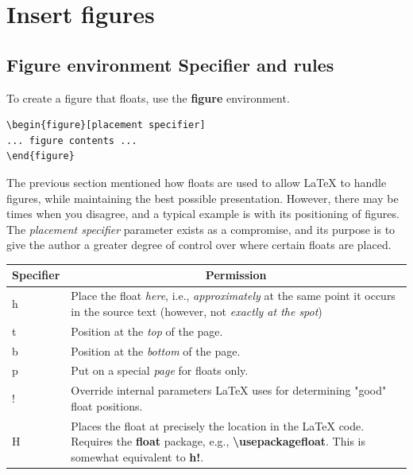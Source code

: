 
\chapter{Insert figures}
\section{Figure environment Specifier and rules}
To create a figure that floats, use the \textbf{figure} environment.

\begin{lstlisting}[language={[LaTeX]TeX}]
\begin{figure}[placement specifier]
... figure contents ...
\end{figure}
\end{lstlisting}

The previous section mentioned how floats are used to allow \LaTeX{} to handle figures, while maintaining the best possible presentation. However, there may be times when you disagree, and a typical example is with its positioning of figures. The \emph{placement specifier} parameter exists as a compromise, and its purpose is to give the author a greater degree of control over where certain floats are placed.

\begin{table}
	\begin{tabular}{|l|p{12cm}|}
		\hline
		\multicolumn{1}{|c|}{\textbf{Specifier}} & \multicolumn{1}{|c|}{\textbf{Permission}}\\
		\hline
		h & Place the float \emph{here}, i.e., \emph{approximately} at the same point it occurs in the source text (however, not \emph{exactly at the spot})\\
		\hline
		t & Position at the \emph{top} of the page.\\
		\hline
		b & Position at the \emph{bottom} of the page.\\
		\hline
		p & Put on a special \emph{page} for floats only.\\
		\hline
		! & Override internal parameters \LaTeX{} uses for determining "good" float positions.\\
		\hline
		H & Places the float at precisely the location in the \LaTeX{} code. Requires the \textbf{float} package, e.g., \textbf{\textbackslash usepackage{float}}. \newline This is somewhat equivalent to \textbf{h!}.\\
		\hline
	\end{tabular}
\end{table}

